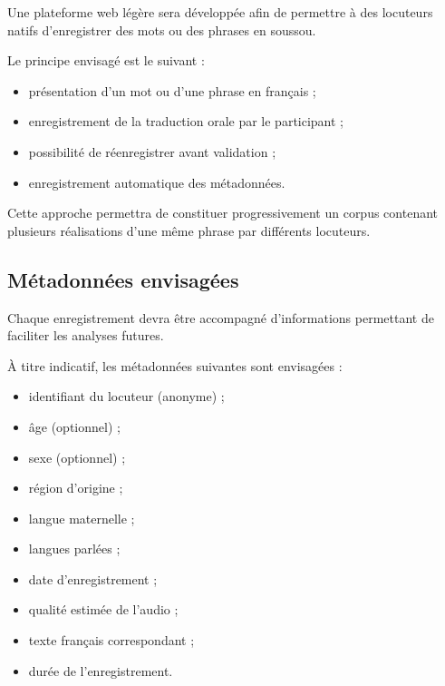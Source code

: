 Une plateforme web légère sera développée afin de permettre à des
locuteurs natifs d'enregistrer des mots ou des phrases en soussou.

Le principe envisagé est le suivant :

\begin{itemize}

\item présentation d'un mot ou d'une phrase en français ;

\item enregistrement de la traduction orale par le participant ;

\item possibilité de réenregistrer avant validation ;

\item enregistrement automatique des métadonnées.

\end{itemize}

Cette approche permettra de constituer progressivement un corpus
contenant plusieurs réalisations d'une même phrase par différents
locuteurs.


\subsection{Métadonnées envisagées}

Chaque enregistrement devra être accompagné d'informations permettant
de faciliter les analyses futures.

À titre indicatif, les métadonnées suivantes sont envisagées :

\begin{itemize}

\item identifiant du locuteur (anonyme) ;

\item âge (optionnel) ;

\item sexe (optionnel) ;

\item région d'origine ;

\item langue maternelle ;

\item langues parlées ;

\item date d'enregistrement ;

\item qualité estimée de l'audio ;

\item texte français correspondant ;

\item durée de l'enregistrement.

\end{itemize}

